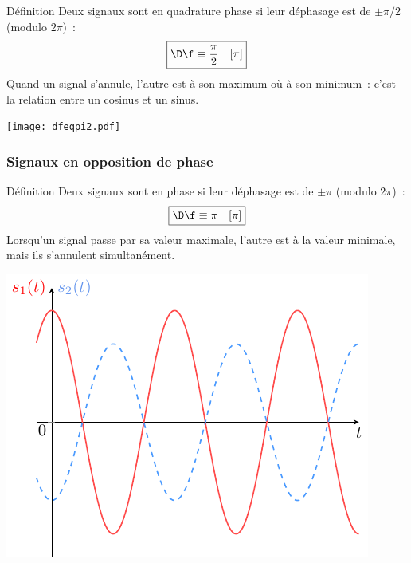 \documentclass[../main/main.tex]{subfiles}
\begin{document}
\begin{minipage}{0.70\linewidth}
    \begin{rdefi}{\small Définition}
        Deux signaux sont en quadrature phase si leur déphasage est de
        $\pm\pi/2$ (modulo $2\pi$)~:
        \[\boxed{\D\f \equiv \frac{\pi}{2} \quad[\pi]}\]
        Quand un signal s'annule, l'autre est à son maximum où à son minimum~:
        c'est la relation entre un cosinus et un sinus.
    \end{rdefi}
\end{minipage}
\hfill
\begin{minipage}{0.30\linewidth}
    \begin{center}
        \texttt{[image: dfeqpi2.pdf]}
    \end{center}
\end{minipage}

\newpage
\subsubsection{Signaux en opposition de phase}

\begin{minipage}{0.70\linewidth}
    \begin{rdefi}{\small Définition}
        Deux signaux sont en phase si leur déphasage est de $\pm\pi$ (modulo $2\pi$)~:
        \[\boxed{\D\f \equiv \pi \quad[\pi]}\]
        Lorsqu'un signal passe par sa valeur maximale, l'autre est à la valeur
        minimale, mais ils s'annulent simultanément.
    \end{rdefi}
\end{minipage}
\hfill
\begin{minipage}{0.30\linewidth}
    \begin{center}
        \includegraphics[width=\linewidth]{dfeqpi.pdf}
    \end{center}
\end{minipage}
\end{document}
